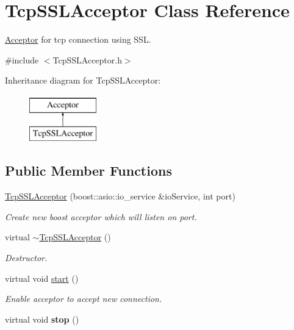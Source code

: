 \hypertarget{class_tcp_s_s_l_acceptor}{\section{Tcp\-S\-S\-L\-Acceptor Class Reference}
\label{class_tcp_s_s_l_acceptor}
}


\hyperlink{class_acceptor}{Acceptor} for tcp connection using S\-S\-L.  




{\ttfamily \#include $<$Tcp\-S\-S\-L\-Acceptor.\-h$>$}

Inheritance diagram for Tcp\-S\-S\-L\-Acceptor\-:\begin{figure}[H]
\begin{center}
\leavevmode
\includegraphics[height=2.000000cm]{class_tcp_s_s_l_acceptor}
\end{center}
\end{figure}
\subsection*{Public Member Functions}
\begin{DoxyCompactItemize}
\item 
\hyperlink{class_tcp_s_s_l_acceptor_afe444560b40a59f4dd3e7280d4e5070a}{Tcp\-S\-S\-L\-Acceptor} (boost\-::asio\-::io\-\_\-service \&io\-Service, int port)
\begin{DoxyCompactList}\small\item\em Create new boost acceptor which will listen on port. \end{DoxyCompactList}\item 
\hypertarget{class_tcp_s_s_l_acceptor_aa7be78522b54bf0b13fbf990b8e2d8ee}{virtual \hyperlink{class_tcp_s_s_l_acceptor_aa7be78522b54bf0b13fbf990b8e2d8ee}{$\sim$\-Tcp\-S\-S\-L\-Acceptor} ()}\label{class_tcp_s_s_l_acceptor_aa7be78522b54bf0b13fbf990b8e2d8ee}

\begin{DoxyCompactList}\small\item\em Destructor. \end{DoxyCompactList}\item 
virtual void \hyperlink{class_tcp_s_s_l_acceptor_a74930bd991e9105de9d0b38945c1247b}{start} ()
\begin{DoxyCompactList}\small\item\em Enable acceptor to accept new connection. \end{DoxyCompactList}\item 
\hypertarget{class_tcp_s_s_l_acceptor_a8d2f687964c65301d9dc56965f8dd69d}{virtual void {\bfseries stop} ()}\label{class_tcp_s_s_l_acceptor_a8d2f687964c65301d9dc56965f8dd69d}

\end{DoxyCompactItemize}


